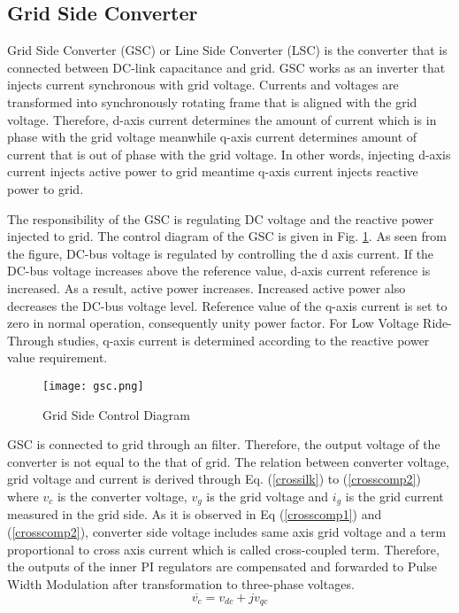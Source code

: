 \subsection{Grid Side Converter}
Grid Side Converter (GSC) or Line Side Converter (LSC) is the converter that is connected between DC-link capacitance and grid. GSC works as an inverter that injects current synchronous with grid voltage. Currents and voltages are transformed into synchronously rotating frame that is aligned with the grid voltage. Therefore, d-axis current determines the amount of current which is in phase with the grid voltage meanwhile q-axis current determines amount of current that is out of phase with the grid voltage. In other words, injecting d-axis current injects active power to grid meantime q-axis current injects reactive power to grid. \par
The responsibility of the GSC is regulating DC voltage and the reactive power injected to grid. The control diagram of the GSC is given in Fig. \ref{gsc}. As seen from the figure, DC-bus voltage is regulated by controlling the d axis current. If the DC-bus voltage increases above the reference value, d-axis current reference is increased. As a result, active power increases. Increased active power also decreases the DC-bus voltage level. Reference value of the q-axis current is set to zero in normal operation, consequently unity power factor. For Low Voltage Ride-Through studies, q-axis current is determined according to the reactive power value requirement. \cite{Orowska-Kowalska2014} \par
\begin{figure}[h!]
	\centering
	\texttt{[image: gsc.png]}
	\caption{Grid Side Control Diagram}
	\label{gsc}
\end{figure}
GSC is connected to grid through an filter. Therefore, the output voltage of the converter is not equal to the that of grid. The relation between converter voltage, grid voltage and current is derived through Eq. (\ref{crossilk}) to (\ref{crosscomp2}) where $v_{c}$ is the converter voltage, $v_{g}$ is the grid voltage and  $i_{g}$ is the grid current measured in the grid side. As it is observed in Eq (\ref{crosscomp1}) and (\ref{crosscomp2}), converter side voltage includes same axis grid voltage and a term proportional to cross axis current which is called cross-coupled term. Therefore, the outputs of the inner PI regulators are compensated and forwarded to Pulse Width Modulation after transformation to three-phase voltages.
\begin{equation}
\overline{v_{c}}=v_{dc}+jv_{qc}
\label{crossilk}
\end{equation}

